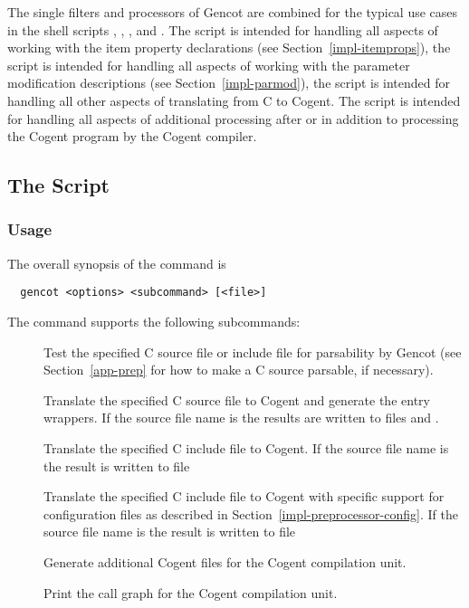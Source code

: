 The single filters and processors of Gencot are combined for the typical use cases in the shell scripts
, , , and . The script  is intended for handling all 
aspects of working with the item property declarations (see Section~\ref{impl-itemprops}), the script  
is intended for handling all aspects
of working with the parameter modification descriptions (see Section~\ref{impl-parmod}), the script
 is intended for handling all other aspects of translating from C to Cogent. The script 
is intended for handling all aspects of additional processing after or in addition to processing the Cogent program by the 
Cogent compiler.

\subsection{The  Script}
\label{impl-all-gencot}

\subsubsection{Usage}

The overall synopsis of the  command is
\begin{verbatim}
  gencot <options> <subcommand> [<file>]
\end{verbatim}

The  command supports the following subcommands:
\begin{description}
\item[] Test the specified C source file or include file for parsability by Gencot (see Section~\ref{app-prep} for how to 
make a C source parsable, if necessary).

\item[] Translate the specified C source file to Cogent and generate the entry wrappers. If the source file name 
is  the results are written to files  and .

\item[] Translate the specified C include file to Cogent. If the source file name is  the result is
written to file 

\item[] Translate the specified C include file to Cogent with specific support for configuration files as described
in Section~\ref{impl-preprocessor-config}. If the source file name is  the result is
written to file 

\item[] Generate additional Cogent files for the Cogent compilation unit.

\item[] Print the call graph for the Cogent compilation unit.

\end{description}

